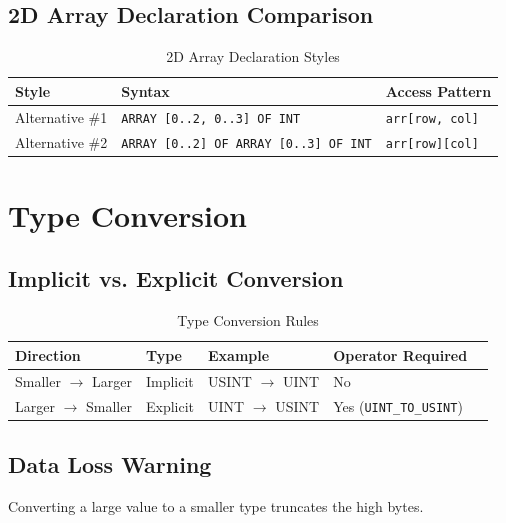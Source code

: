 \documentclass[11pt,a4paper]{article}
\begin{document}
\subsection{2D Array Declaration Comparison}

\begin{table}[h]
\centering
\begin{tabular}{@{}lll@{}}
\toprule
\textbf{Style} & \textbf{Syntax} & \textbf{Access Pattern} \\
\midrule
Alternative \#1 & \texttt{ARRAY [0..2, 0..3] OF INT} & \texttt{arr[row, col]} \\
Alternative \#2 & \texttt{ARRAY [0..2] OF ARRAY [0..3] OF INT} & \texttt{arr[row][col]} \\
\bottomrule
\end{tabular}
\caption{2D Array Declaration Styles}
\end{table}

\section{Type Conversion}

\subsection{Implicit vs. Explicit Conversion}

\begin{table}[h]
\centering
\begin{tabular}{@{}lllll@{}}
\toprule
\textbf{Direction} & \textbf{Type} & \textbf{Example} & \textbf{Operator Required} \\
\midrule
Smaller $\rightarrow$ Larger & Implicit & USINT $\rightarrow$ UINT & No \\
Larger $\rightarrow$ Smaller & Explicit & UINT $\rightarrow$ USINT & Yes (\texttt{UINT\_TO\_USINT}) \\
\bottomrule
\end{tabular}
\caption{Type Conversion Rules}
\end{table}

\subsection{Data Loss Warning}

\begin{warningbox}
Converting a large value to a smaller type truncates the high bytes.
\end{warningbox}
\end{document}
